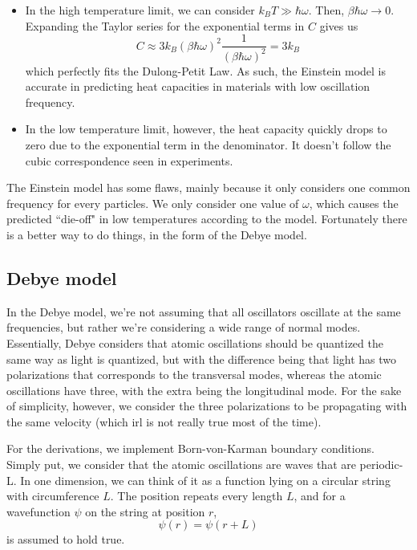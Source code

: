 \documentclass[12pt]{article}
\begin{document}
\begin{itemize}
    \item In the high temperature limit, we can consider $k_BT\gg\hbar\omega$. Then, $\beta\hbar\omega\rightarrow0$. Expanding the Taylor series for the exponential terms in $C$ gives us
    \begin{equation*}
        C\approx3k_B(\beta\hbar\omega)^2\frac{1}{(\beta\hbar\omega)^2}=3k_B
    \end{equation*}
    which perfectly fits the Dulong-Petit Law. As such, the Einstein model is accurate in predicting heat capacities in materials with low oscillation frequency.
    \item In the low temperature limit, however, the heat capacity quickly drops to zero due to the exponential term in the denominator. It doesn't follow the cubic correspondence seen in experiments.
\end{itemize}
The Einstein model has some flaws, mainly because it only considers one common frequency for every particles. We only consider one value of $\omega$, which causes the predicted ``die-off" in low temperatures according to the model. Fortunately there is a better way to do things, in the form of the Debye model.
\newpage
\subsection{Debye model}
In the Debye model, we're not assuming that all oscillators oscillate at the same frequencies, but rather we're considering a wide range of normal modes. Essentially, Debye considers that atomic oscillations should be quantized the same way as light is quantized, but with the difference being that light has two polarizations that corresponds to the transversal modes, whereas the atomic oscillations have three, with the extra being the longitudinal mode. For the sake of simplicity, however, we consider the three polarizations to be propagating with the same velocity (which irl is not really true most of the time).

\vspace{0.25 in}

For the derivations, we implement Born-von-Karman boundary conditions. Simply put, we consider that the atomic oscillations are waves that are periodic-L. In one dimension, we can think of it as a function lying on a circular string with circumference $L$. The position repeats every length $L$, and for a wavefunction $\psi$ on the string at position $r$, 
\begin{equation*}
    \psi(r)=\psi(r+L)
\end{equation*}
is assumed to hold true.
\end{document}
